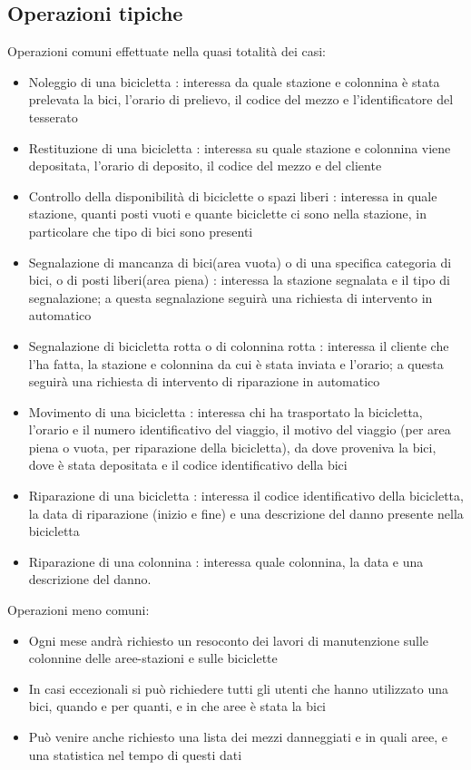 \documentclass[a4paper,twoside]{article}
\begin{document}
\subsection{Operazioni tipiche}
Operazioni comuni effettuate nella quasi totalità dei casi:
\begin{itemize}
 \item Noleggio di una bicicletta : interessa da quale stazione e colonnina è stata prelevata la bici, l'orario di prelievo, il codice del mezzo e l'identificatore del tesserato
 \item Restituzione di una bicicletta : interessa su quale stazione e colonnina viene depositata, l'orario di deposito, il codice del mezzo e del cliente
 \item Controllo della disponibilità di biciclette o spazi liberi : interessa in quale stazione, quanti posti vuoti e quante biciclette ci sono nella stazione, in particolare che tipo di bici sono presenti
 \item Segnalazione di mancanza di bici(area vuota) o di una specifica categoria di bici, o di posti liberi(area piena) : interessa la stazione segnalata e il tipo di segnalazione; a questa segnalazione seguirà una richiesta di intervento in automatico
 \item Segnalazione di bicicletta rotta o di colonnina rotta : interessa il cliente che l'ha fatta, la stazione e colonnina da cui è stata inviata e l'orario; a questa seguirà una richiesta di intervento di riparazione in automatico
 \item Movimento di una bicicletta : interessa chi ha trasportato la bicicletta, l'orario e il numero identificativo del viaggio, il motivo del viaggio (per area piena o vuota, per riparazione della bicicletta), da dove proveniva la bici, dove è stata depositata e il codice identificativo della bici
 \item Riparazione di una bicicletta : interessa il codice identificativo della bicicletta, la data di riparazione (inizio e fine) e una descrizione del danno presente nella bicicletta
 \item Riparazione di una colonnina : interessa quale colonnina, la data e una descrizione del danno.
\end{itemize}
Operazioni meno comuni:
\begin{itemize}
 \item Ogni mese andrà richiesto un resoconto dei lavori di manutenzione sulle colonnine delle aree-stazioni e sulle biciclette
 \item In casi eccezionali si può richiedere tutti gli utenti che hanno utilizzato una bici, quando e per quanti, e in che aree è stata la bici
 \item Può venire anche richiesto una lista dei mezzi danneggiati e in quali aree, e una statistica nel tempo di questi dati
\end{itemize}
\end{document}
